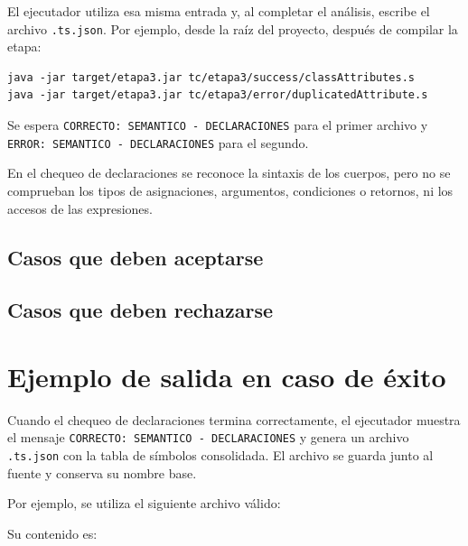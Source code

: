 El ejecutador  utiliza esa misma entrada y, al completar
el análisis, escribe el archivo \texttt{.ts.json}. Por ejemplo, desde
la raíz del proyecto, después de compilar la etapa:
\begin{verbatim}
java -jar target/etapa3.jar tc/etapa3/success/classAttributes.s
java -jar target/etapa3.jar tc/etapa3/error/duplicatedAttribute.s
\end{verbatim}
Se espera \texttt{CORRECTO: SEMANTICO - DECLARACIONES} para el primer
archivo y \texttt{ERROR: SEMANTICO - DECLARACIONES} para el segundo.

En el chequeo de declaraciones se reconoce la sintaxis de los cuerpos,
pero no se comprueban los tipos de asignaciones, argumentos, condiciones
o retornos, ni los accesos de las expresiones.

\subsection{Casos que deben aceptarse}


\subsection{Casos que deben rechazarse}

\endgroup

\clearpage
\section{Ejemplo de salida en caso de éxito}
\label{sec:ejemplo-json-declaraciones}
Cuando el chequeo de declaraciones termina correctamente, el ejecutador
 muestra el mensaje
\texttt{CORRECTO: SEMANTICO - DECLARACIONES} y genera un archivo
\texttt{.ts.json} con la tabla de símbolos consolidada. El archivo se
guarda junto al fuente y conserva su nombre base.

Por ejemplo, se utiliza el siguiente archivo válido:
\begin{quote}
\end{quote}
Su contenido es:


